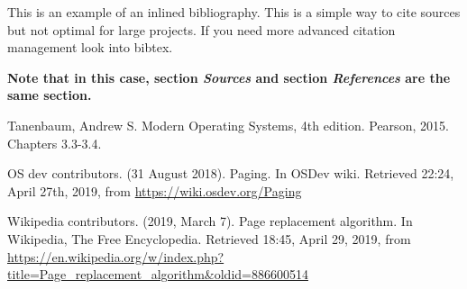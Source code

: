 \documentclass{article}
\begin{document}
\begin{flushleft}
This is an example of an inlined bibliography. This is a simple way to cite sources but not optimal for large projects. If you need more advanced citation management look into bibtex.

\bigskip

\textbf{Note that in this case, section \textit{Sources} and section \textit{References} are the same section.}

\begin{thebibliography}{9}

        Tanenbaum, Andrew S. Modern Operating Systems, 4th edition. Pearson, 2015. Chapters 3.3-3.4.

        OS dev contributors. (31 August 2018). Paging. In OSDev wiki. Retrieved
        22:24, April 27th, 2019, from \url{https://wiki.osdev.org/Paging}

        Wikipedia contributors. (2019, March 7). Page replacement algorithm. In Wikipedia, 
        The Free Encyclopedia. Retrieved 18:45, April 29, 2019, 
        from \url{https://en.wikipedia.org/w/index.php?title=Page_replacement_algorithm&oldid=886600514}

\end{thebibliography}

\bigskip
\end{flushleft}
\end{document}
